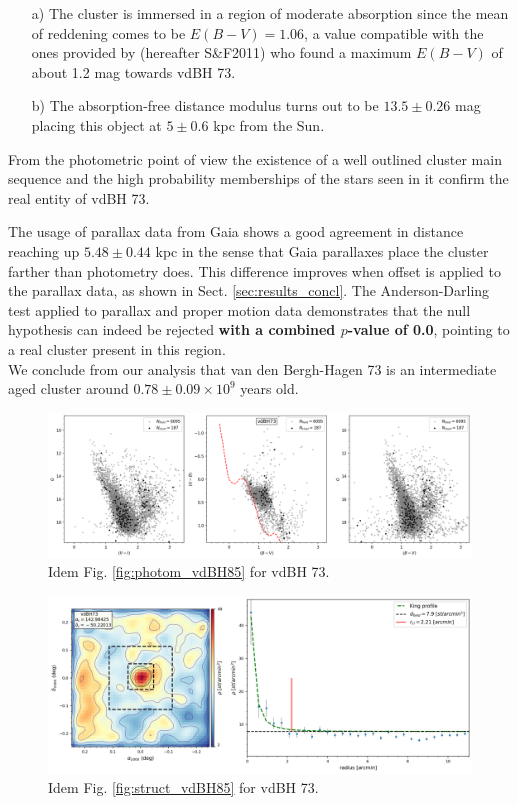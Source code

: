 \documentclass[referee]{aa}
\begin{document}
\begin{itemize}
\item [a)] The cluster is immersed in a region of moderate absorption
since the mean of reddening comes to be $E(B-V)=1.06$, a value compatible
with the ones provided by \cite{Schlafly_2011} (hereafter S\&F2011) who
found a maximum $E(B-V)$ of about 1.2 mag towards vdBH 73.
\item [b)] The absorption-free distance modulus turns out to be
$13.5\pm0.26$ mag placing this object at $5\pm0.6$ kpc from the Sun.
\end{itemize}

From the photometric point of view the existence of a well outlined cluster main
sequence and the high probability memberships of the stars seen in it confirm
the real entity of vdBH 73.

The usage of parallax data from Gaia shows a good agreement in distance
reaching up $5.48\pm0.44$ kpc in the sense that Gaia parallaxes place the
cluster farther than photometry does. This difference improves when offset is
applied to the parallax data, as shown in Sect. \ref{sec:results_concl}.
The Anderson-Darling test applied to parallax and proper motion data
demonstrates that the null hypothesis can indeed be rejected \textbf{with a
combined $p$-value of 0.0}, pointing to a real cluster present in this
region.\\

We conclude from our analysis that van den Bergh-Hagen 73 is an intermediate
aged cluster around $0.78\pm0.09\times10^9$ years old.


\begin{figure}[ht]
    \centering
    \includegraphics[width=\hsize]{../figs/obs_vdBH73.png}
\caption{Idem Fig. \ref{fig:photom_vdBH85} for vdBH 73.}
    \label{fig:photom_vdBH73}
\end{figure}

\begin{figure}[ht]
    \centering
    \includegraphics[width=\hsize]{../figs/dmap_vdbh73.png}
\caption{Idem Fig. \ref{fig:struct_vdBH85} for vdBH 73.}
    \label{fig:struct_vdBH73}
\end{figure}
\end{document}
